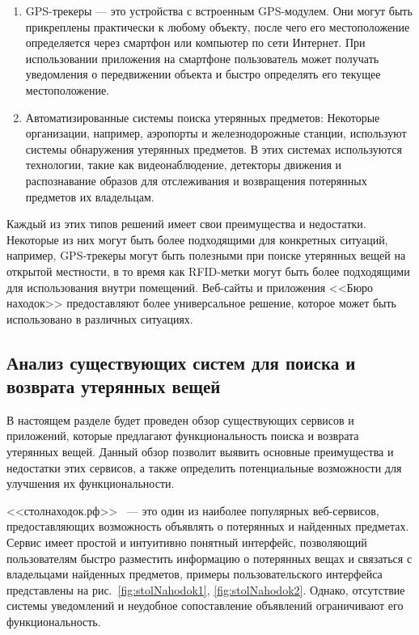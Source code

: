 \documentclass{mirea-article}
\begin{document}
\begin{multicols}{2}
\begin{enumerate}
			\item GPS-трекеры --- это устройства с встроенным GPS-модулем. Они могут быть прикреплены практически к любому объекту, после чего его местоположение определяется через смартфон или компьютер по сети Интернет. При использовании приложения на смартфоне пользователь может получать уведомления о передвижении объекта и быстро определять его текущее местоположение.
			
			\item Автоматизированные системы поиска утерянных предметов: Некоторые организации, например, аэропорты и железнодорожные станции, используют системы обнаружения утерянных предметов. В этих системах используются технологии, такие как видеонаблюдение, детекторы движения и распознавание образов для отслеживания и возвращения потерянных предметов их владельцам.
		\end{enumerate}
		
		Каждый из этих типов решений имеет свои преимущества и недостатки. Некоторые из них могут быть более подходящими для конкретных ситуаций, например, GPS-трекеры могут быть полезными при поиске утерянных вещей на открытой местности, в то время как RFID-метки могут быть более подходящими для использования внутри помещений. Веб-сайты и приложения <<Бюро находок>> предоставляют более универсальное решение, которое может быть использовано в различных ситуациях.
		
		\subsection*{Анализ существующих систем для поиска и возврата утерянных вещей}
		
		В настоящем разделе будет проведен обзор существующих сервисов и приложений, которые предлагают функциональность поиска и возврата утерянных вещей. Данный обзор позволит выявить основные преимущества и недостатки этих сервисов, а также определить потенциальные возможности для улучшения их функциональности.
		
		<<столнаходок.рф>>~\cite{bib:stol_nahodok} --- это один из наиболее популярных веб-сервисов, предоставляющих возможность объявлять о потерянных и найденных предметах. Сервис имеет простой и интуитивно понятный интерфейс, позволяющий пользователям быстро разместить информацию о потерянных вещах и связаться с владельцами найденных предметов, примеры пользовательского интерфейса представлены на рис.~\ref{fig:stolNahodok1}, \ref{fig:stolNahodok2}. Однако, отсутствие системы уведомлений и неудобное сопоставление объявлений ограничивают его функциональность.
		

\end{multicols}
\end{document}
